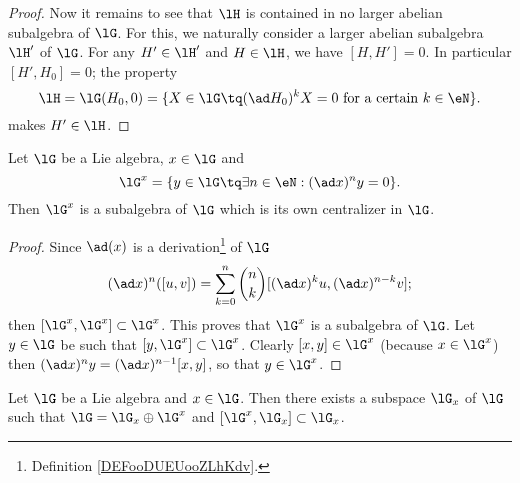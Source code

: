 \begin{proof}
	Now it remains to see that $\lH$ is contained in no larger abelian subalgebra of $\lG$. For this, we naturally consider a larger abelian subalgebra $\lH'$ of $\lG$. For any $H'\in\lH'$ and $H\in\lH$, we have $[H,H']=0$. In particular $[H',H_0]=0$; the property
	\[
		\lH=\lG(H_0,0)=\{X\in\lG\tq (\ad H_0)^kX=0\text{ for a certain }k\in\eN\}.
	\]
	makes $H'\in\lH$.
\end{proof}


\begin{proposition}\label{prop:G_x_central}
	Let $\lG$ be a Lie algebra, $x\in\lG$ and
	\begin{equation}
		\lG^x=\{y\in\lG\tq\exists n\in\eN:(\ad x)^ny=0\}.
	\end{equation}
	Then $\lG^x$ is a subalgebra of $\lG$ which is its own centralizer in $\lG$.
\end{proposition}

\begin{proof}
	Since $\ad(x)$ is a derivation\footnote{Definition \ref{DEFooDUEUooZLhKdv}.} of $\lG$
	\[
		(\ad x)^n([u,v])=\sum_{k=0}^n \binom{n}{k} [ (\ad x)^ku,(\ad x)^{n-k}v ];
	\]
	then $[\lG^x,\lG^x]\subset\lG^x$. This proves that $\lG^x$ is a subalgebra of $\lG$. Let $y\in\lG$ be such that $[y,\lG^x]\subset\lG^x$. Clearly $[x,y]\in\lG^x$ (because $x\in\lG^x$) then $(\ad x)^ny=(\ad x)^{n-1}[x,y]$, so that $y\in\lG^x$.
\end{proof}

\begin{proposition}
	Let $\lG$ be a Lie algebra and $x\in\lG$. Then there exists a subspace $\lG_x$ of $\lG$ such that $\lG=\lG_x\oplus\lG^x$ and $[\lG^x,\lG_x]\subset\lG_x$.
	\label{prop:G_x_G_x}
\end{proposition}

